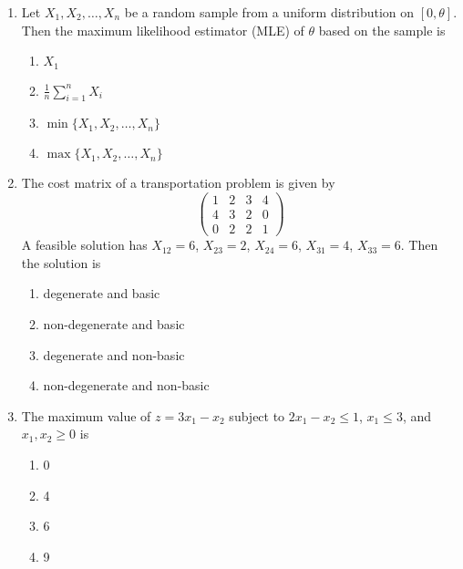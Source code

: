 \documentclass[journal]{IEEEtran}
\numberwithin{equation}{enumi}
\numberwithin{figure}{enumi}
\begin{document}
\begin{enumerate}
\item
Let $X_1, X_2, \ldots, X_n$ be a random sample from a uniform distribution on $[0,\theta]$. Then the maximum likelihood estimator (MLE) of $\theta$ based on the sample is
\hfill{}
\begin{multicols}{4}
\begin{enumerate}
    \item $X_1$
    \item $\frac{1}{n} \sum_{i=1}^n X_i$
    \item $\min\{X_1, X_2, \ldots, X_n\}$
    \item $\max\{X_1, X_2, \ldots, X_n\}$
\end{enumerate}
\end{multicols}

\item
The cost matrix of a transportation problem is given by
\[
\begin{pmatrix}
1 & 2 & 3 & 4 \\
4 & 3 & 2 & 0 \\
0 & 2 & 2 & 1
\end{pmatrix}
\]
A feasible solution has $X_{12} = 6$, $X_{23} = 2$, $X_{24} = 6$, $X_{31} = 4$, $X_{33} = 6$. Then the solution is
\hfill{}
\begin{multicols}{2}
\begin{enumerate}
    \item degenerate and basic
    \item non-degenerate and basic
    \item degenerate and non-basic
    \item non-degenerate and non-basic
\end{enumerate}
\end{multicols}

\item
The maximum value of $z = 3x_1 - x_2$ subject to $2x_1 - x_2 \leq 1$, $x_1 \leq 3$, and $x_1, x_2 \geq 0$ is
\hfill{}
\begin{multicols}{4}
\begin{enumerate}
    \item 0
    \item 4
    \item 6
    \item 9
\end{enumerate}
\end{multicols}


\end{enumerate}
\end{document}

